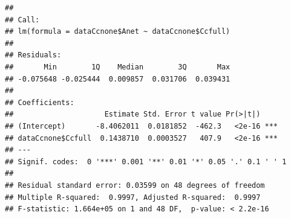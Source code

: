 \documentclass[
]{krantz}
\makeatletter
\newenvironment{Shaded}{\begin{snugshade}}{\end{snugshade}}
\newcommand{\CommentTok}[1]{\textcolor[rgb]{0.56,0.35,0.01}{\textit{#1}}}
\newcommand{\DecValTok}[1]{\textcolor[rgb]{0.00,0.00,0.81}{#1}}
\newcommand{\KeywordTok}[1]{\textcolor[rgb]{0.13,0.29,0.53}{\textbf{#1}}}
\newcommand{\NormalTok}[1]{#1}
\newcommand{\OperatorTok}[1]{\textcolor[rgb]{0.81,0.36,0.00}{\textbf{#1}}}
\newcommand{\StringTok}[1]{\textcolor[rgb]{0.31,0.60,0.02}{#1}}
\newenvironment{kframe}{%
\medskip{}
\setlength{\fboxsep}{.8em}
 \def\at@end@of@kframe{}%
 \ifinner\ifhmode%
  \def\at@end@of@kframe{\end{minipage}}%
  \begin{minipage}{\columnwidth}%
 \fi\fi%
 \def\FrameCommand##1{\hskip\@totalleftmargin \hskip-\fboxsep
 \colorbox{shadecolor}{##1}\hskip-\fboxsep
     \hskip-\linewidth \hskip-\@totalleftmargin \hskip\columnwidth}%
 \MakeFramed {\advance\hsize-\width
   \@totalleftmargin\z@ \linewidth\hsize
   \@setminipage}}%
 {\par\unskip\endMakeFramed%
 \at@end@of@kframe}
\renewenvironment{Shaded}{\begin{kframe}}{\end{kframe}}
\makeatother
\begin{document}
\begin{Shaded}
\end{Shaded}

\begin{verbatim}
## 
## Call:
## lm(formula = dataCcnone$Anet ~ dataCcnone$Ccfull)
## 
## Residuals:
##       Min        1Q    Median        3Q       Max 
## -0.075648 -0.025444  0.009857  0.031706  0.039431 
## 
## Coefficients:
##                     Estimate Std. Error t value Pr(>|t|)    
## (Intercept)       -8.4062011  0.0181852  -462.3   <2e-16 ***
## dataCcnone$Ccfull  0.1438710  0.0003527   407.9   <2e-16 ***
## ---
## Signif. codes:  0 '***' 0.001 '**' 0.01 '*' 0.05 '.' 0.1 ' ' 1
## 
## Residual standard error: 0.03599 on 48 degrees of freedom
## Multiple R-squared:  0.9997,	Adjusted R-squared:  0.9997 
## F-statistic: 1.664e+05 on 1 and 48 DF,  p-value: < 2.2e-16
\end{verbatim}
\end{document}
